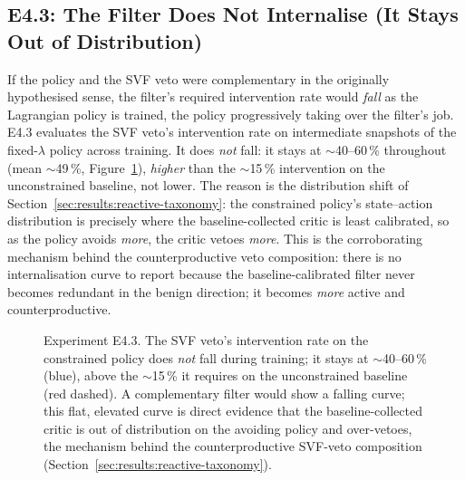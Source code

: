 \documentclass[11pt,a4paper]{report}
\begin{document}
\subsection{E4.3: The Filter Does Not Internalise (It Stays Out of Distribution)}
\label{sec:results:interaction}

If the policy and the SVF veto were complementary in the originally
hypothesised sense, the filter's required intervention rate would
\emph{fall} as the Lagrangian policy is trained, the policy
progressively taking over the filter's job. E4.3 evaluates the SVF
veto's intervention rate on intermediate snapshots of the
fixed-$\lambda$ policy across training. It does \emph{not} fall: it
stays at $\sim$40--60\,\% throughout (mean $\sim$49\,\%, Figure~\ref{fig:e4.3-internalisation}),
\emph{higher} than the $\sim$15\,\% intervention on the unconstrained
baseline, not lower. The reason is the distribution shift of
Section~\ref{sec:results:reactive-taxonomy}: the constrained policy's
state--action distribution is precisely where the baseline-collected
critic is least calibrated, so as the policy avoids \emph{more}, the
critic vetoes \emph{more}. This is the corroborating mechanism behind
the counterproductive veto composition: there is no internalisation
curve to report because the baseline-calibrated filter never becomes
redundant in the benign direction; it becomes \emph{more} active and
counterproductive.

\begin{figure}[htbp]
\centering
{}
\caption{Experiment E4.3. The SVF veto's intervention rate on the
constrained policy does \emph{not} fall during training; it stays at
$\sim$40--60\,\% (blue), above the $\sim$15\,\% it requires on the
unconstrained baseline (red dashed). A complementary filter would show
a falling curve; this flat, elevated curve is direct evidence that the
baseline-collected critic is out of distribution on the avoiding
policy and over-vetoes, the mechanism behind the counterproductive
SVF-veto composition
(Section~\ref{sec:results:reactive-taxonomy}).}
\label{fig:e4.3-internalisation}
\end{figure}
\end{document}
